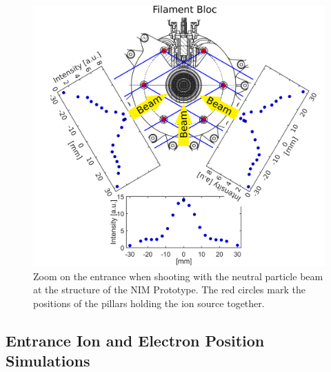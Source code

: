 	\begin{figure}[h!]
		\centering
		\includegraphics[width=\textwidth]{Experiments/Entrence_Proto_topview.png}
		\caption{Zoom on the entrance when shooting with the neutral particle beam at the structure of the NIM Prototype. The red circles mark the positions of the pillars holding the ion source together.}
		\label{exp:ProtoIntCharEnt}
	\end{figure}
	
	
	\subsection{Entrance Ion and Electron Position Simulations}
	
